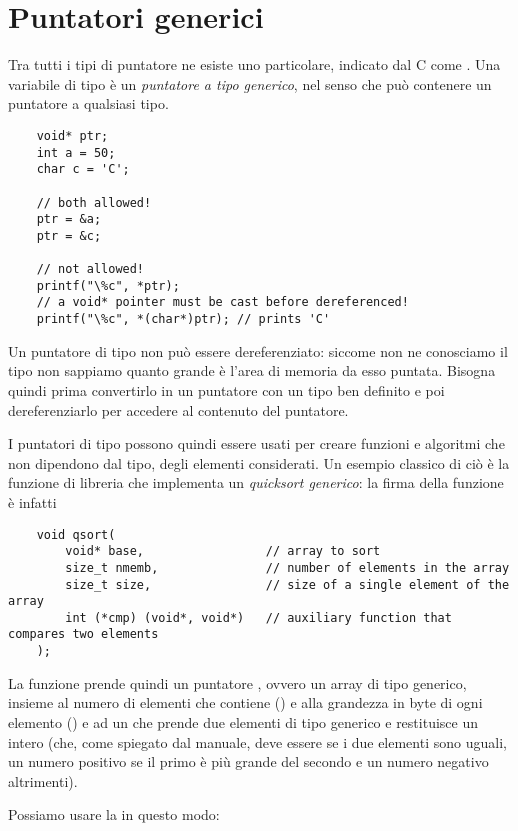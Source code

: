 \section{Puntatori generici}

Tra tutti i tipi di puntatore ne esiste uno particolare, indicato dal C come . Una variabile di tipo  è un \emph{puntatore a tipo generico}, nel senso che può contenere un puntatore a qualsiasi tipo.

\begin{verbatim}
    void* ptr;
    int a = 50;
    char c = 'C';

    // both allowed!
    ptr = &a;
    ptr = &c;

    // not allowed!
    printf("\%c", *ptr);
    // a void* pointer must be cast before dereferenced!
    printf("\%c", *(char*)ptr); // prints 'C'
\end{verbatim}

Un puntatore di tipo  non può essere dereferenziato: siccome non ne conosciamo il tipo non sappiamo quanto grande è l'area di memoria da esso puntata. Bisogna quindi prima convertirlo in un puntatore con un tipo ben definito e poi dereferenziarlo per accedere al contenuto del puntatore.

I puntatori di tipo  possono quindi essere usati per creare funzioni e algoritmi che non dipendono dal tipo, degli elementi considerati. Un esempio classico di ciò è la funzione di libreria  che implementa un \emph{quicksort generico}: la firma della funzione è infatti
\begin{verbatim}
    void qsort(
        void* base,                 // array to sort
        size_t nmemb,               // number of elements in the array
        size_t size,                // size of a single element of the array
        int (*cmp) (void*, void*)   // auxiliary function that compares two elements
    );
\end{verbatim}

La funzione  prende quindi un puntatore , ovvero un array di tipo generico, insieme al numero di elementi che contiene () e alla grandezza in byte di ogni elemento () e ad un  che prende due elementi di tipo generico e restituisce un intero (che, come spiegato dal manuale, deve essere  se i due elementi sono uguali, un numero positivo se il primo è più grande del secondo e un numero negativo altrimenti).

Possiamo usare la  in questo modo:

\inputminted{c}{./c_files/qsort_exmpl.c}